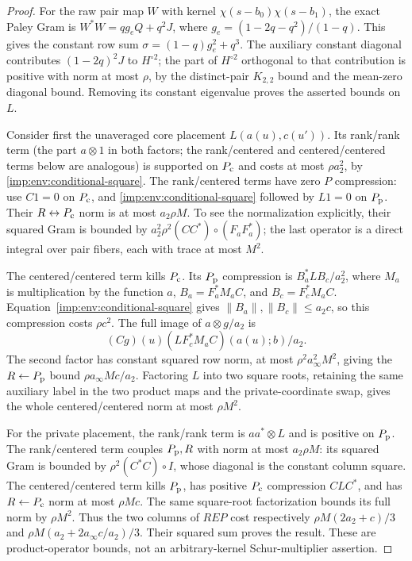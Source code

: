 \begin{proof}
For the raw pair map $W$ with kernel
$\chi(s-b_0)\chi(s-b_1)$, the exact Paley Gram is
$W^*W=qg_eQ+q^2J$, where $g_e=(1-2q-q^2)/(1-q)$.
This gives the constant row sum
$\sigma=(1-q)g_e^2+q^3$.
The auxiliary constant diagonal contributes $(1-2q)^2J$ to
$H^{\circ2}$; the part of $H^{\circ2}$ orthogonal to that contribution is positive with norm at
most $\rho$, by the distinct-pair $K_{2,2}$ bound and the
mean-zero diagonal bound.  Removing its constant eigenvalue proves
the asserted bounds on $L$.

Consider first the unaveraged core placement $L(a(u),c(u'))$.
Its rank/rank term (the part $a\otimes1$ in both factors; the rank/centered and centered/centered terms below are analogous) is supported on $P_{\rm c}$ and costs at most
$\rho a_2^2$, by \eqref{imp:env:conditional-square}.
The rank/centered terms have zero $P$ compression: use $C1=0$
on $P_{\rm c}$, and \eqref{imp:env:conditional-square} followed by
$L1=0$ on $P_{\rm p}$.  Their $R\leftrightarrow P_{\rm c}$ norm is at most
$a_2\rho M$.  To see the normalization explicitly, their squared
Gram is bounded by
$a_2^2\rho^2(CC^*)\circ(F_aF_a^*)$; the last operator is a direct
integral over pair fibers, each with trace at most $M^2$.

The centered/centered term kills $P_{\rm c}$.  Its $P_{\rm p}$ compression is
$B_a^*LB_c/a_2^2$, where $M_a$ is multiplication by the
function $a$, $B_a=F_a^*M_aC$, and $B_c=F_c^*M_aC$.
Equation~\eqref{imp:env:conditional-square} gives
$\|B_a\|,\|B_c\|\le a_2c$, so this compression costs $\rho c^2$.
The full image of $a\otimes g/a_2$ is
\[
 (Cg)(u)(LF_c^*M_aC)(a(u);b)/a_2.
\]
The second factor has constant squared row norm, at most
$\rho^2a_\infty^2M^2$, giving the $R\leftarrow P_{\rm p}$ bound
$\rho a_\infty Mc/a_2$.
Factoring $L$ into two square roots, retaining the same auxiliary
label in the two product maps and the private-coordinate swap,
gives the whole centered/centered norm at most $\rho M^2$.

For the private placement, the rank/rank term is $aa^*\otimes L$
and is positive on $P_{\rm p}$.  The rank/centered term couples $P_{\rm p},R$
with norm at most $a_2\rho M$: its squared Gram is bounded by
$\rho^2(C^*C)\circ I$, whose diagonal is the constant column square.
The centered/centered term kills $P_{\rm p}$, has positive $P_{\rm c}$
compression $CLC^*$, and has $R\leftarrow P_{\rm c}$ norm at most
$\rho Mc$.  The same square-root factorization bounds its full
norm by $\rho M^2$.
Thus the two columns of $REP$ cost respectively
$\rho M(2a_2+c)/3$ and
$\rho M(a_2+2a_\infty c/a_2)/3$.
Their squared sum proves the result.  These are product-operator
bounds, not an arbitrary-kernel Schur-multiplier assertion.
\end{proof}

